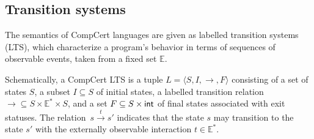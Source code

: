 \documentclass[sigplan,10pt,authordraft]{acmart}
\begin{document}
%

\subsection{Transition systems} %

The semantics of CompCert languages are
given as labelled transition systems (LTS),
which characterize a program's behavior in terms of
sequences of observable events,
taken from a fixed set $\mathbb{E}$.

Schematically, a CompCert LTS
is a tuple
$L = \langle S, I, {\rightarrow}, F \rangle$
consisting of
a set of states $S$,
a subset $I \subseteq S$ of initial states,
a labelled transition relation
${\rightarrow} \subseteq S \times \mathbb{E}^* \times S$,
and a set
$F \subseteq S \times  \mathsf{int} $
of final states associated with exit statuses.
The relation~$s \stackrel{t}{\rightarrow} s'$
indicates that the state $s$ may transition to the state $s'$
with the externally observable interaction $t \in \mathbb{E}^*$.
\end{document}
